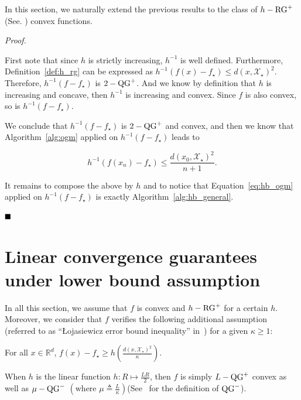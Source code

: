     In this section, we naturally extend the previous results to the class of $h-\operatorname{RG}^+$ (See. ) convex functions.

    \hbgeneral*

    \noindent \textit{Proof.}

        First note that since $h$ is strictly increasing, $h^{-1}$ is well defined.
        Furthermore, Definition~\ref{def:h_rg} can be expressed as
        $h^{-1}\left(f(x)-f_\star\right) \leq d(x, \mathcal{X}_\star)^2.$
        Therefore, $h^{-1}\left(f-f_\star\right)$ is $2-\operatorname{QG}^+$.
        And we know by definition that $h$ is increasing and concave, then $h^{-1}$ is increasing and convex.
        Since $f$ is also convex, so is $h^{-1}\left(f-f_\star\right)$.

        We conclude that $h^{-1}\left(f-f_\star\right)$ is $2-\operatorname{QG}^+$ and convex, and then we know that Algorithm~\ref{alg:ogm} applied on $h^{-1}\left(f-f_\star\right)$ leads to

        \begin{equation*}
            h^{-1}\left(f(x_n) - f_\star\right) \leq \frac{d(x_0, \mathcal{X}_\star)^2}{n+1}.
        \end{equation*}

        It remains to compose the above by $h$ and to notice that Equation~\ref{eq:hb_ogm} applied on $h^{-1}\left(f-f_\star\right)$ is exactly Algorithm~\ref{alg:hb_general}.

    $\hfill\blacksquare$

\section{Linear convergence guarantees under lower bound assumption}
\label{apx:restart}

    In all this section, we assume that $f$ is convex and $h-\operatorname{RG}^+$ for a certain $h$.
    Moreover, we consider that $f$ verifies the following additional assumption (referred to as ``\L{}ojasiewicz error bound inequality'' in~\citep{bolte2017error}) for a given $\kappa \geq 1$:

    \begin{Assump}
        \label{assump:h_kappa}
        For all $x \in \mathbb{R}^d$, $f(x)-f_\star \geq h\left( \frac{ d(x, \mathcal{X}_\star)^2}{\kappa} \right)$.
    \end{Assump}

    \begin{Rem}
        When $h$ is the linear function $h: R \mapsto \frac{LR}{2}$, then $f$ is simply $L-\operatorname{QG}^+$ convex as well as $\mu-\operatorname{QG}^-$ $\left(\text{where } \mu \triangleq \frac{L}{\kappa}\right)$(See~\citep{guille2021study} for the definition of $\operatorname{QG}^-$).
    \end{Rem}

